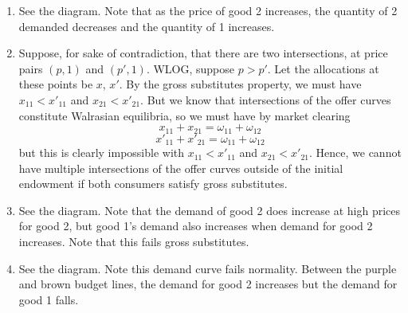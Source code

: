 \documentclass[10pt,letter]{article}
\begin{document}
\begin{enumerate}[label=(\alph*)]
\item See the diagram. Note that as the price of good 2 increases, the quantity of 2 demanded decreases and the quantity of 1 increases.

\item Suppose, for sake of contradiction, that there are two intersections, at price pairs $(p, 1)$ and $(p', 1)$. WLOG, suppose $p > p'$. Let the allocations at these points be $x$, $x'$. By the gross substitutes property, we must have $x_{11} < x'_{11}$ and $x_{21} < x'_{21}$. But we know that intersections of the offer curves constitute Walrasian equilibria, so we must have by market clearing
\[ x_{11} + x_{21} = \omega_{11} + \omega_{12}  \]
\[ x'_{11} + x'_{21} = \omega_{11} + \omega_{12}  \]
but this is clearly impossible with $x_{11} < x'_{11}$ and $x_{21} < x'_{21}$. Hence, we cannot have multiple intersections of the offer curves outside of the initial endowment if both consumers satisfy gross substitutes.
\item See the diagram. Note that the demand of good 2 does increase at high prices for good 2, but good 1's demand also increases when demand for good 2 increases. Note that this fails gross substitutes.

\item See the diagram. Note this demand curve fails normality. Between the purple and brown budget lines, the demand for good 2 increases but the demand for good 1 falls.


\end{enumerate}
\end{document}

